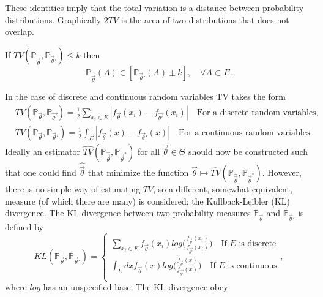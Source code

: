 These identities imply that the total variation is a distance between probability distributions. Graphically $2TV$ is the area of two distributions that does not overlap. 
\begin{example}
	If $TV(\mathbb{P}_{\hat{\vec{\theta}}},\mathbb{P}_{\vec{\theta}'})\leq k$ then
	\begin{equation}
		\mathbb{P}_{\hat{\vec{\theta}}}(A)\in [\mathbb{P}_{\vec{\theta}'}(A)\pm k], \quad \forall A\subset E.
	\end{equation}
\end{example}
In the case of discrete and continuous random variables TV takes the form
\begin{equation}
	\begin{split}
		&TV(\mathbb{P}_{\vec{\theta}},\mathbb{P}_{\vec{\theta'}})=\frac{1}{2}\sum_{x_i\in E}|f_{\vec{\theta}}(x_i)-f_{\vec{\theta'}}(x_i)|\quad \text{For a discrete random variables},\\
		&TV(\mathbb{P}_{\vec{\theta}},\mathbb{P}_{\vec{\theta}'})=\frac{1}{2}\int_E|f_{\vec{\theta}}(x)-f_{\vec{\theta}'}(x)|\quad \text{For a continuous random variables}.
	\end{split}
\end{equation}
Ideally an estimator $\widehat{TV}(\mathbb{P}_{\hat{\vec{\theta}}},\mathbb{P}_{\vec{\theta}^*})$ for all $\vec{\theta}\in \Theta$ should now be constructed such that one could find $\hat{\vec{\theta}}$ that minimize the function $\vec{\theta}\mapsto \widehat{TV}(\mathbb{P}_{\hat{\vec{\theta}}},\mathbb{P}_{\vec{\theta}^*})$. However, there is no simple way of estimating $TV$, so a different, somewhat equivalent, measure (of which there are many) is considered; the Kullback-Leibler (KL) divergence. The KL divergence  between two probability measures $\mathbb{P}_{\vec{\theta}}$ and $\mathbb{P}_{\vec{\theta}'}$ is defined by
\begin{equation}
	KL(\mathbb{P}_{\vec{\theta}},\mathbb{P}_{\vec{\theta}'})=\begin{cases}
		\sum_{x_i\in E}f_{\vec{\theta}}(x_i)log\bigg(\frac{f_{\vec{\theta}}(x_i)}{f_{\vec{\theta'}}(x_i)}\bigg) \quad \text{If $E$ is discrete}\\
		\int_Edx f_{\vec{\theta}}(x)log\bigg(\frac{f_{\vec{\theta}}(x)}{f_{\vec{\theta'}}(x)}\bigg) \quad \text{If $E$ is continuous}\\
	\end{cases},
\end{equation}
where $log$ has an unspecified base. The KL divergence obey

